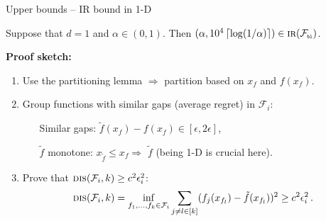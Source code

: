 \documentclass{beamer}
\newcommand{\dis}{\operatorname{\textsc{dis}}}
\newcommand{\cF}{\mathcal{F}}
\newcommand{\pb}{\text{\tiny\texttt{b}}}
\newcommand{\pl}{\text{\tiny\texttt{l}}}
\newcommand{\IR}{\operatorname{\textsc{ir}}}
\newcommand{\ceil}[1]{\left\lceil #1 \right\rceil}
\begin{document}

\begin{frame}{Upper bounds -- IR bound in 1-D}
    \small
    \begin{tcolorbox}[title=Theorem 3 -- IR bound for 1-D,colback=blue!5!white,colframe=blue!50!black]
        Suppose that $d = 1$ and $\alpha \in (0,1)$. Then $(\alpha, 10^4 \ceil{\log(1/\alpha)}) \in \IR(\cF_{\pb\pl})$.
    \end{tcolorbox}
    \textbf{Proof sketch:}
    \begin{enumerate}
        \item Use the partitioning lemma $\Rightarrow$ partition  based on $x_f$ and $f(x_f)$.
        \item Group functions with similar gaps (average regret) in $\cF_i$:
              \begin{enumerate}
                  \leftskip=4em %
                  \item[Similar gaps:] $\tilde{f}(x_f) - f(x_f) \in [\epsilon, 2\epsilon]$,
                  \item[$\tilde{f}$ monotone:] $x_{\tilde{f}} \leq x_f \Rightarrow $ $\tilde{f}$ (being 1-D is crucial here).
              \end{enumerate}
        \item Prove that $\dis(\cF_i, k) \geq c^2\epsilon_i^2$:
              \[
                  \dis(\cF_i, k) = \inf_{f_1,\ldots,f_k \in \cF_i} \sum_{j\neq l \in [k]} (f_j(x_{f_l}) - \tilde f(x_{f_l}))^2 \geq c^2\epsilon_i^2\,.
              \]
    \end{enumerate}
\end{frame}
\end{document}

